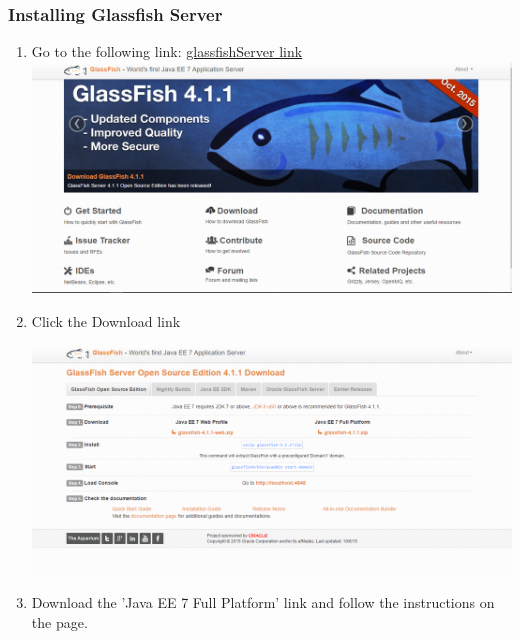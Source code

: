 \documentclass[a4paper,12pt]{article}
\begin{document}
\newpage
\subsubsection{Installing Glassfish Server}
\begin{enumerate}
\item Go to the following link: \href{https://glassfish.java.net/download.html}{glassfishServer link}\\[0.2cm]
\includegraphics[width=0.9\linewidth, center]{./Installation/glassfish_download_1.PNG}\\[0.4cm]
\item Click the Download link

\includegraphics[width=0.9\linewidth, center]{./Installation/glassfish_download_2.PNG}\\[0.4cm]

\item Download  the 'Java EE 7 Full Platform' link and follow the instructions on the page.
\end{enumerate}

\newpage
\end{document}

